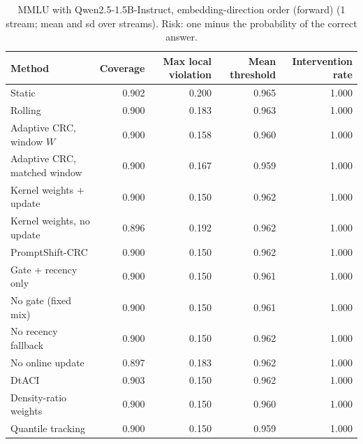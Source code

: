 \begin{table}[H]
\centering
\small
\caption{MMLU with Qwen2.5-1.5B-Instruct, embedding-direction order (forward) (1 stream; mean and sd over streams). Risk: one minus the probability of the correct answer.}
\label{tab:mmlu_pc1_forward}
\begin{tabular}{lrrrr}
\toprule
Method & Coverage & Max local violation & Mean threshold & Intervention rate \\
\midrule
Static & 0.902 & 0.200 & 0.965 & 1.000 \\
Rolling & 0.900 & 0.183 & 0.963 & 1.000 \\
Adaptive CRC, window $W$ & 0.900 & 0.158 & 0.960 & 1.000 \\
Adaptive CRC, matched window & 0.900 & 0.167 & 0.959 & 1.000 \\
Kernel weights + update & 0.900 & 0.150 & 0.962 & 1.000 \\
Kernel weights, no update & 0.896 & 0.192 & 0.962 & 1.000 \\
PromptShift-CRC & 0.900 & 0.150 & 0.962 & 1.000 \\
Gate + recency only & 0.900 & 0.150 & 0.961 & 1.000 \\
No gate (fixed mix) & 0.900 & 0.150 & 0.961 & 1.000 \\
No recency fallback & 0.900 & 0.150 & 0.962 & 1.000 \\
No online update & 0.897 & 0.183 & 0.962 & 1.000 \\
DtACI & 0.903 & 0.150 & 0.962 & 1.000 \\
Density-ratio weights & 0.900 & 0.150 & 0.960 & 1.000 \\
Quantile tracking & 0.900 & 0.150 & 0.959 & 1.000 \\
\bottomrule
\end{tabular}
\end{table}

